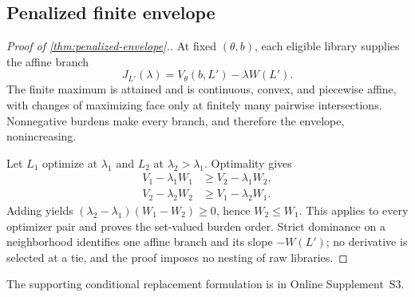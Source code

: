 \subsection{Penalized finite envelope}
\label{app:penalized-proof}

\begin{proof}[Proof of \cref{thm:penalized-envelope}.]
At fixed \((\theta,b)\), each eligible library supplies the affine branch
\[
 J_{L'}(\lambda)=V_\theta(b,L')-\lambda W(L').
\]
The finite maximum is attained and is continuous, convex, and piecewise
affine, with changes of maximizing face only at finitely many pairwise
intersections.  Nonnegative burdens make every branch, and therefore the
envelope, nonincreasing.

Let \(L_1\) optimize at \(\lambda_1\) and \(L_2\) at
\(\lambda_2>\lambda_1\).  Optimality gives
\begin{align*}
 V_1-\lambda_1W_1&\ge V_2-\lambda_1W_2,\\
 V_2-\lambda_2W_2&\ge V_1-\lambda_2W_1.
\end{align*}
Adding yields \((\lambda_2-\lambda_1)(W_1-W_2)\ge0\), hence
\(W_2\le W_1\).  This applies to every optimizer pair and proves the
set-valued burden order.  Strict dominance on a neighborhood identifies one
affine branch and its slope \(-W(L')\); no derivative is selected at a tie,
and the proof imposes no nesting of raw libraries.
\end{proof}

The supporting conditional replacement formulation is in Online
Supplement~S3.
